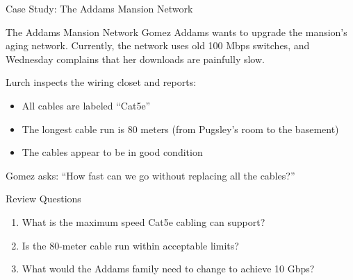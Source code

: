 \documentclass[aspectratio=169]{beamer}  %
\begin{document}
\begin{frame}{Case Study: The Addams Mansion Network}
    \begin{casestudy}{The Addams Mansion Network}
        Gomez Addams wants to upgrade the mansion's aging network. Currently, the network uses old 100 Mbps switches, and Wednesday complains that her downloads are painfully slow.
        
        \vspace{0.5em}
        Lurch inspects the wiring closet and reports:
        \begin{itemize}
            \small
            \item All cables are labeled ``Cat5e''
            \item The longest cable run is 80 meters (from Pugsley's room to the basement)
            \item The cables appear to be in good condition
        \end{itemize}
        
        \vspace{0.5em}
        Gomez asks: ``How fast can we go without replacing all the cables?''
    \end{casestudy}
    
    \begin{block}{Review Questions}
        \small
        \begin{enumerate}
            \item What is the maximum speed Cat5e cabling can support?
            \item Is the 80-meter cable run within acceptable limits?
            \item What would the Addams family need to change to achieve 10 Gbps?
        \end{enumerate}
    \end{block}
\end{frame}
\end{document}

